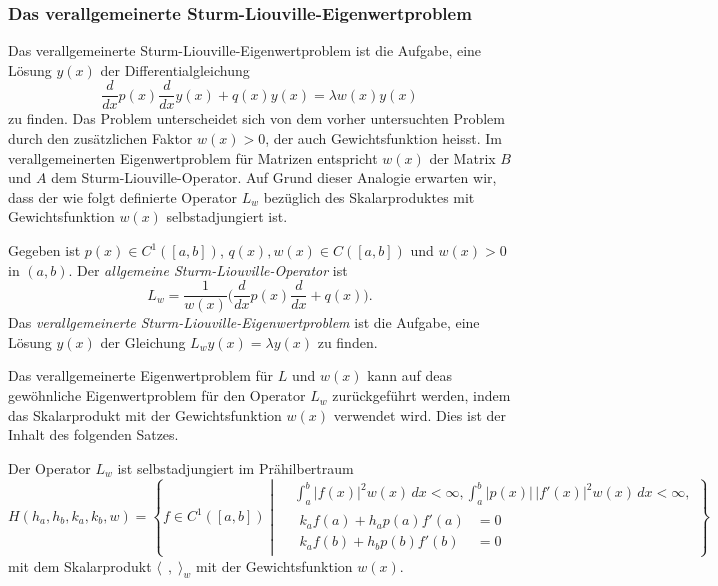%
%
\subsubsection{Das verallgemeinerte Sturm-Liouville-Eigenwertproblem}
Das verallgemeinerte Sturm-Liouville-Eigenwertproblem ist die Aufgabe,
eine Lösung $y(x)$ der Differentialgleichung
\[
\frac{d}{dx}p(x)\frac{d}{dx} y(x)
+ q(x)y(x)
=
\lambda w(x) y(x)
\]
zu finden.
Das Problem unterscheidet sich von dem vorher untersuchten Problem durch
den zusätzlichen Faktor $w(x)>0$, der auch Gewichtsfunktion heisst.
Im verallgemeinerten Eigenwertproblem für Matrizen entspricht $w(x)$ 
der Matrix $B$ und $A$ dem Sturm-Liouville-Operator.
Auf Grund dieser Analogie erwarten wir, dass der wie folgt
definierte Operator $L_w$ bezüglich des Skalarproduktes mit Gewichtsfunktion
$w(x)$ selbstadjungiert ist.

\begin{definition}
Gegeben ist $p(x)\in C^1([a,b])$, $q(x),w(x)\in C([a,b])$ und $w(x)>0$
in $(a,b)$.
Der {\em allgemeine Sturm-Liouville-Operator} ist
\[
L_w
=
\frac{1}{w(x)}
\biggl(
\frac{d}{dx}p(x)\frac{d}{dx}
+
q(x)
\biggr).
\]
Das {\em verallgemeinerte Sturm-Liouville-Eigenwertproblem} ist die Aufgabe,
eine Lösung $y(x)$ der Gleichung
\(
L_wy(x) = \lambda y(x)
\)
zu finden.
\end{definition}

Das verallgemeinerte Eigenwertproblem für $L$ und $w(x)$ kann auf
deas gewöhnliche Eigenwertproblem für den Operator $L_w$ 
zurückgeführt werden, indem das Skalarprodukt mit der Gewichtsfunktion
$w(x)$ verwendet wird.
Dies ist der Inhalt des folgenden Satzes.

\begin{satz}
Der Operator $L_w$ ist selbstadjungiert im Prähilbertraum
\[
H(h_a,h_b,k_a,k_b,w)
=
\left\{
f \in C^1([a,b])
\;
\left|
\;
\begin{aligned}
&\int_a^b |f(x)|^2w(x)\,dx < \infty,
\int_a^b |p(x)|\, |f'(x)|^2w(x)\,dx < \infty,
\\
&
\begin{aligned}
k_af(a) + h_ap(a)f'(a) &= 0 \\
k_af(b) + h_bp(b)f'(b) &= 0 
\end{aligned}
\end{aligned}
\right.
\right\}
\]
mit dem Skalarprodukt $\langle \;\,,\;\rangle_w$ mit der Gewichtsfunktion
$w(x)$.
\end{satz}

